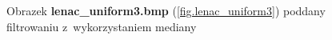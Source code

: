 \documentclass{classrep}
\begin{document}
\begin{figure}
{{  \label{fig.lenac_uniform3_median_5x5}
 }
}
\caption{Obrazek \textbf{lenac\_uniform3.bmp} (\ref{fig.lenac_uniform3}) poddany filtrowaniu z~wykorzystaniem mediany}
\label{fig.lenac_uniform3_median}
\end{figure}
\end{document}

